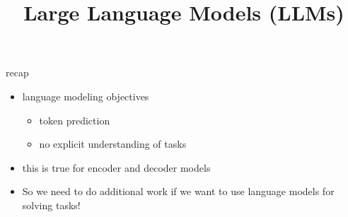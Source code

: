 



\newcommand{\learninggoals}{
\item comprehend the different subtleties in the space between supervised fine-tuning and zero-shot prompting}

\def\myblue#1{\textcolor{texblue}{#1}}

\title{Large Language Models (LLMs)}
\date{}




\begin{frame}{recap}

\vfill

\begin{itemize}
    \item language modeling objectives
        \begin{itemize}
            \item token prediction
            \item no explicit understanding of tasks
        \end{itemize}
    \item this is true for encoder and decoder models
    \item So we need to do additional work if we want
        to use language models for solving tasks!
\end{itemize}

\vfill

\end{frame}


